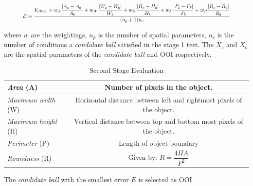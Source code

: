 \documentclass[a4paper]{article}
\begin{document}
\begin{equation}\resizebox{.9\hsize}{!}{
$E = \dfrac{E_{RUC} + w_{A}\dfrac{|{A_{c}-A_{b}}|}{A_{b}} + w_{W}\dfrac{|{W_{c}-W_{b}}|}{W_{b}} + w_{H}\dfrac{|{H_{c}-H_{b}}|}{H_{b}} + w_{P}\dfrac{|{P_{c}-P_{b}}|}{P_{b}} + w_{R}\dfrac{|{R_{c}-R_{b}}|}{R_{b}}}{(n_{p}+1)n_{c}}$
}
\end{equation}
 
where $w$ are the weightings, $n_{p}$ is the number of spatial parameters, $n_{c}$ is the number of conditions a \textit{candidate ball} satisfied in the stage 1 test. The $X_{c}$ and $X_{b}$ are the spatial parameters of the \textit{candidate ball} and OOI respectively. 
 
\begin{table}[!ht]
\begin{tabularx}{\textwidth}{|s|C|}
\hline
	\textit{Area} (A) & 
	Number of pixels in the object.  \\ \hline
	\textit{Maximum width} (W) & 
	Horizontal distance between left and rightmost pixels of the object. \\ \hline
    \textit{Maximum height} (H) & 
	Vertical distance between top and bottom most pixels of the object. \\ \hline
	\textit{Perimeter} (P) & 
	Length of object boundary \\ \hline
	\textit{Roundness} (R) & 
	Given by:
	$ R = \dfrac{4 \Pi A}{P^2} $ \\ \hline
\end{tabularx}
\caption{Second Stage Evaluation}
\label{table:second}
\end{table} 
 
The \textit{candidate ball} with the smallest error $E$ is selected as OOI. 
 
\end{document}
